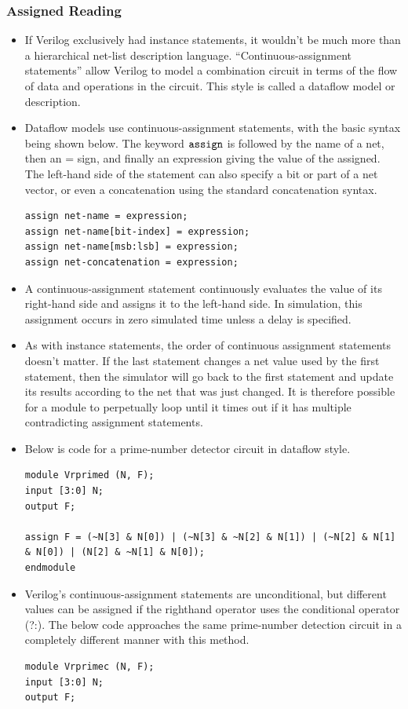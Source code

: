 \documentclass[10pt,a4paper]{article}
\begin{document}
\subsubsection{Assigned Reading}
\begin{itemize}
\item If Verilog exclusively had instance statements, it wouldn't be much more than a hierarchical net-list description language. ``Continuous-assignment statements'' allow Verilog to model a combination circuit in terms of the flow of data and operations in the circuit. This style is called a dataflow model or description.
\item Dataflow models use continuous-assignment statements, with the basic syntax being shown below. The keyword $\tt{assign}$ is followed by the name of a net, then an = sign, and finally an expression giving the value of the assigned. The left-hand side of the statement can also specify a bit or part of a net vector, or even a concatenation using the standard concatenation syntax.
\begin{lstlisting}
assign net-name = expression;
assign net-name[bit-index] = expression;
assign net-name[msb:lsb] = expression;
assign net-concatenation = expression;
\end{lstlisting}
\item A continuous-assignment statement continuously evaluates the value of its right-hand side and assigns it to the left-hand side. In simulation, this assignment occurs in zero simulated time unless a delay is specified.
\item As with instance statements, the order of continuous assignment statements doesn't matter. If the last statement changes a net value used by the first statement, then the simulator will go back to the first statement and update its results according to the net that was just changed. It is therefore possible for a module to perpetually loop until it times out if it has multiple contradicting assignment statements.
\item Below is code for a prime-number detector circuit in dataflow style. 
\begin{lstlisting}
module Vrprimed (N, F);
input [3:0] N;
output F;

assign F = (~N[3] & N[0]) | (~N[3] & ~N[2] & N[1]) | (~N[2] & N[1] & N[0]) | (N[2] & ~N[1] & N[0]);
endmodule
\end{lstlisting}
\item Verilog's continuous-assignment statements are unconditional, but different values can be assigned if the righthand operator uses the conditional operator (?:). The below code approaches the same prime-number detection circuit in a completely different manner with this method.
\begin{lstlisting}
module Vrprimec (N, F);
input [3:0] N;
output F;


\end{lstlisting}
\end{itemize}
\end{document}
